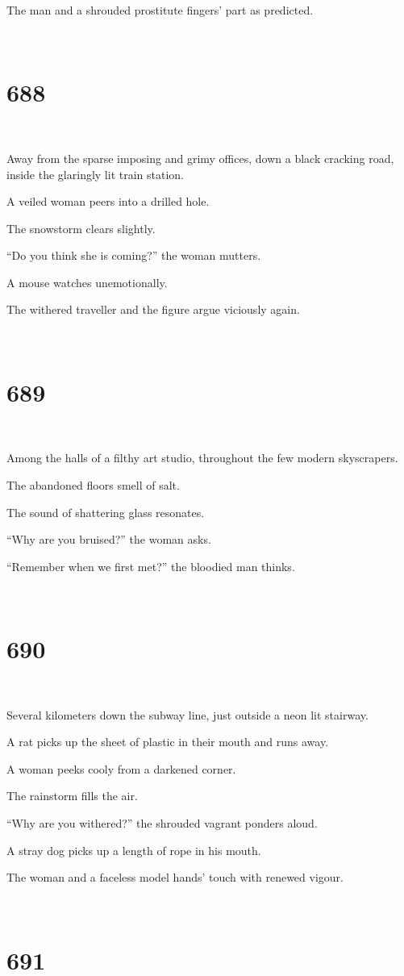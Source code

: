 \documentclass{report}
\begin{document}
The man and a shrouded prostitute fingers' part as predicted.

~
\chapter*{688}
~

Away from the sparse imposing and grimy offices, down a black cracking road, inside the glaringly lit train station.

A veiled woman peers into a drilled hole.

The snowstorm clears slightly.

``Do you think she is coming?'' the woman mutters.

A mouse watches unemotionally.

The withered traveller and the figure argue viciously again.

~
\chapter*{689}
~

Among the halls of a filthy art studio, throughout the few modern skyscrapers.

The abandoned floors smell of salt.

The sound of shattering glass resonates.

``Why are you bruised?'' the woman asks.

``Remember when we first met?'' the bloodied man thinks.

~
\chapter*{690}
~

Several kilometers down the subway line, just outside a neon lit stairway.

A rat picks up the sheet of plastic in their mouth and runs away.

A woman peeks cooly from a darkened corner.

The rainstorm fills the air.

``Why are you withered?'' the shrouded vagrant ponders aloud.

A stray dog picks up a length of rope in his mouth.

The woman and a faceless model hands' touch with renewed vigour.

~
\chapter*{691}
~
\end{document}
